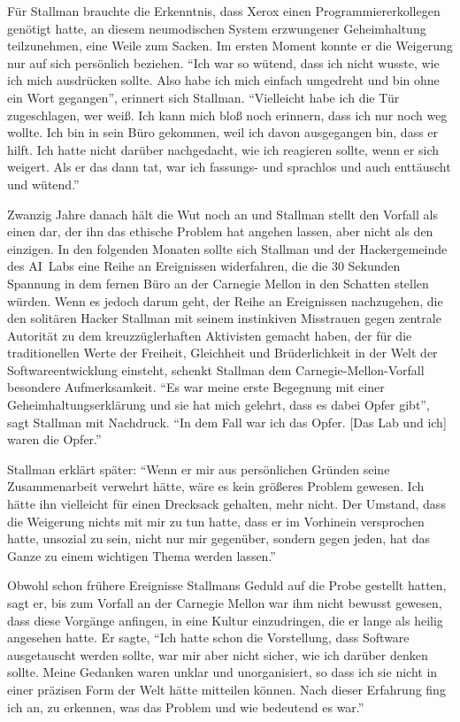 Für Stallman brauchte die Erkenntnis, dass Xerox einen Programmiererkollegen genötigt hatte, an diesem neumodischen System erzwungener Geheimhaltung teilzunehmen, eine Weile zum Sacken. Im ersten Moment konnte er die Weigerung nur auf sich persönlich beziehen. "`Ich war so wütend, dass ich nicht wusste, wie ich mich ausdrücken sollte. Also habe ich mich einfach umgedreht und bin ohne ein Wort gegangen"', erinnert sich Stallman. "`Vielleicht habe ich die Tür zugeschlagen, wer weiß. Ich kann mich bloß noch erinnern, dass ich nur noch weg wollte. Ich bin in sein Büro gekommen, weil ich davon ausgegangen bin, dass er hilft. Ich hatte nicht darüber nachgedacht, wie ich reagieren sollte, wenn er sich weigert. Als er das dann tat, war ich fassungs- und sprachlos und auch enttäuscht und wütend."' 

Zwanzig Jahre danach hält die Wut noch an und Stallman stellt den Vorfall als einen dar, der ihn das ethische Problem hat angehen lassen, aber nicht als den einzigen. In den folgenden Monaten sollte sich Stallman und der Hackergemeinde des AI~Labs eine Reihe an Ereignissen widerfahren, die die 30 Sekunden Spannung in dem fernen Büro an der Carnegie Mellon in den Schatten stellen würden. Wenn es jedoch darum geht, der Reihe an Ereignissen nachzugehen, die den solitären Hacker Stallman mit seinem instinkiven Misstrauen gegen zentrale Autorität zu dem kreuzzüglerhaften Aktivisten gemacht haben, der für die traditionellen Werte der Freiheit, Gleichheit und Brüderlichkeit in der Welt der Softwareentwicklung einsteht, schenkt Stallman dem Carnegie-Mellon-Vorfall besondere Aufmerksamkeit.
"`Es war meine erste Begegnung mit einer Geheimhaltungserklärung und sie hat mich gelehrt, dass es dabei Opfer gibt"', sagt Stallman mit Nachdruck. "`In dem Fall war ich das Opfer. [Das Lab und ich] waren die Opfer."'

Stallman erklärt später: "`Wenn er mir aus persönlichen Gründen seine Zusammenarbeit verwehrt hätte, wäre es kein größeres Problem gewesen. Ich hätte ihn vielleicht für einen Drecksack gehalten, mehr nicht. Der Umstand, dass die Weigerung nichts mit mir zu tun hatte, dass er im Vorhinein versprochen hatte, unsozial zu sein, nicht nur mir gegenüber, sondern gegen jeden, hat das Ganze zu einem wichtigen Thema werden lassen."'

Obwohl schon frühere Ereignisse Stallmans Geduld auf die Probe gestellt hatten, sagt er, bis zum Vorfall an der Carnegie Mellon war ihm nicht bewusst gewesen, dass diese Vorgänge anfingen, in eine Kultur einzudringen, die er lange als heilig angesehen hatte. Er sagte, "`Ich hatte schon die Vorstellung, dass Software ausgetauscht werden sollte, war mir aber nicht sicher, wie ich darüber denken sollte. Meine Gedanken waren unklar und unorganisiert, so dass ich sie nicht in einer präzisen Form der Welt hätte mitteilen können. Nach dieser Erfahrung fing ich an, zu erkennen, was das Problem und wie bedeutend es war."'


